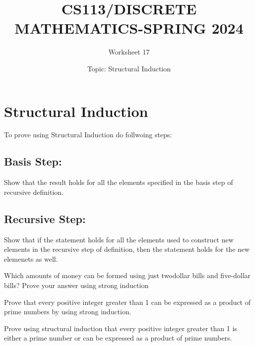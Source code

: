\documentclass{exam}
\title{CS113/DISCRETE MATHEMATICS-SPRING 2024}
\author{Worksheet 17}
\date{Topic: Structural Induction}
\begin{document}
\maketitle

\begin{center}
\end{center}

\vspace{5mm}

\vspace{5mm}

\section{Structural Induction}
To prove using Structural Induction do follwoing steps:
\subsection{Basis Step:}
Show that the result holds for all the elements specified in the basis step of recursive definition.
\subsection{Recursive Step:}
Show that if the statement holds for all the elements used to construct new elements in the recursive step of definition, then the statement holds for the new elemenets as well.

\vspace{5mm}
\begin{questions}

\question
Which amounts of money can be formed using just twodollar bills and five-dollar bills? Prove your answer using
strong induction
\vspace{9in}

\question Prove that every positive integer greater than 1 can be expressed as a product of prime numbers by using strong induction.
\vspace{9in}

\question Prove using structural induction that every positive integer greater than 1 is either a prime number or can be expressed as a product of prime numbers.

\vspace{9in}


\end{questions}
\end{document}
